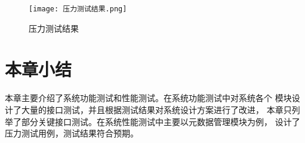 \begin{figure}[h]
  \centering
  \texttt{[image: 压力测试结果.png]}
  \caption{压力测试结果}
  \label{fig:badge}
\end{figure}

\section{本章小结}

本章主要介绍了系统功能测试和性能测试。在系统功能测试中对系统各个
模块设计了大量的接口测试，并且根据测试结果对系统设计方案进行了改进，
本章只列举了部分关键接口测试。在系统性能测试中主要以元数据管理模块为例，
设计了压力测试用例，测试结果符合预期。
